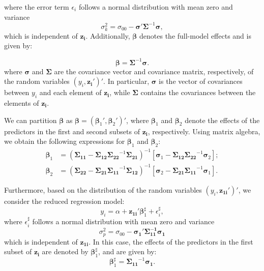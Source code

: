 where the error term $\epsilon_i$ follows a normal distribution with mean zero and variance \begin{equation}\label{eq:sigmak2}
\sigma_k^2 = \sigma_{00} - \boldsymbol{\sigma}' \boldsymbol{\Sigma}^{-1} \boldsymbol{\sigma},
\end{equation} which is independent of $\boldsymbol{z_i}$.
 Additionally, $\boldsymbol{\beta}$ denotes the full-model effects and is given by:

\begin{equation}
\label{eq:full.reg.coeff}
\boldsymbol{\beta} = \boldsymbol{\Sigma}^{-1}\boldsymbol{\sigma}. 
\end{equation}
where $\boldsymbol{\sigma}$ and $\boldsymbol{\Sigma}$ are the covariance vector and covariance matrix, respectively, of the random variables $(y_i, \boldsymbol{z_i}')'$. In particular, $\boldsymbol{\sigma}$ is the vector of covariances between $y_i$ and each element of $\boldsymbol{z_i}$, while $\boldsymbol{\Sigma}$ contains the covariances between the elements of $\boldsymbol{z_i}$.

We can partition $\boldsymbol{\beta}$ as $\boldsymbol{\beta} = (\boldsymbol{\beta}_1', \boldsymbol{\beta}_2')'$, where $\boldsymbol{\beta}_1$ and $\boldsymbol{\beta}_2$ denote the effects of the predictors in the first and second subsets of $\boldsymbol{z_i}$, respectively. Using matrix algebra, we obtain the following expressions for $\boldsymbol{\beta}_1$ and $\boldsymbol{\beta}_2$:
\begin{equation}
\begin{aligned}
\boldsymbol{\beta}_1 &= ( \boldsymbol{\Sigma_{11}} -  \boldsymbol{\Sigma_{12}} \boldsymbol{\Sigma_{22}}^{-1}  \boldsymbol{\Sigma_{21}})^{-1}[\boldsymbol{\sigma}_1 -  \boldsymbol{\Sigma_{12}} \boldsymbol{\Sigma_{22}}^{-1}\boldsymbol{\sigma}_2]; \\
\boldsymbol{\beta}_2 &= ( \boldsymbol{\Sigma_{22}} -  \boldsymbol{\Sigma_{21}} \boldsymbol{\Sigma_{11}}^{-1}  \boldsymbol{\Sigma_{12}})^{-1}[\boldsymbol{\sigma}_2 -  \boldsymbol{\Sigma_{21}} \boldsymbol{\Sigma_{11}}^{-1}\boldsymbol{\sigma}_1].
\end{aligned}
\end{equation}

Furthermore, based on the distribution of the random variables $(y_i, \boldsymbol{z_{1i}}')'$, we consider the reduced regression model:
\begin{equation}
y_i = \alpha + \boldsymbol{z_{1i}}'\boldsymbol{\beta}_1^\sharp + \epsilon_i^\sharp,
\end{equation}
where $\epsilon_i^\sharp$ follows a normal distribution with mean zero and variance 
\begin{equation}\label{eq:sigmap2}
\sigma_p^2 = \sigma_{00} - \boldsymbol{\sigma_1'\Sigma^{-1}_{11}\sigma_1}
\end{equation}
which is independent of $\boldsymbol{z_{1i}}$. In this case, the effects of the predictors in the first subset of $\boldsymbol{z_i}$ are denoted by $\boldsymbol{\beta}_1^\sharp$, and are given by:
\begin{equation}
\label{eq:redu.reg.coeff}
\boldsymbol{\beta}_1^\sharp = \boldsymbol{\Sigma_{11}}^{-1}\boldsymbol{\sigma_1}.
\end{equation} 

